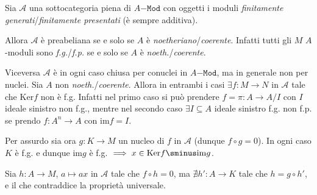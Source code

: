 \begin{example}{}
    Sia \(\mathcal{A}\) una sottocategoria piena di \(A\mathtt{-Mod}\) con
    oggetti i moduli \emph{finitamente generati}/\emph{finitamente presentati}
    (è sempre additiva).

    Allora \(\mathcal{A}\) è preabeliana se e solo se \(A\) è
    \emph{noetheriano}/\emph{coerente}.
    Infatti tutti gli \(M\) \(A\)-moduli sono \emph{f.g.}/\emph{f.p.} se e solo
    se \(A\) è \emph{noeth.}/\emph{coerente}.

    Viceversa \(\mathcal{A}\) è in ogni caso chiusa per conuclei in
    \(A\mathtt{-Mod}\), ma in generale non per nuclei. Sia \(A\) non
    \emph{noeth.}/\emph{coerente}. Allora in entrambi i casi \(\exists f : M \to
    N\) in \(\mathcal{A}\) tale che \(\mathrm{Ker}f\) non è f.g.
    Infatti nel primo caso si può prendere \(f = \pi : A \to A/{I}\)
    con \({I}\)
    ideale sinistro non f.g., mentre nel secondo caso \(\exists  {I}
    \subseteq A \) ideale sinistro f.g. non f.p. se prendo \(f : A^{n} \to A\)
    con \(\mathrm{im}f = {I}\).

    Per assurdo sia ora \(g : K \to M\) un nucleo di \(f\) in \(\mathcal{A}\)
    (dunque \(f \circ g = 0\)). In ogni caso \(K\) è f.g. e dunque \(\mathrm{im}g\) è f.g. 
    \(\implies  x \in \mathrm{Ker}f \sminus \mathrm{im}g\).

    Sia \(h : A \to M\), \(a \mapsto ax\) in \(\mathcal{A}\) tale che \(f \circ
    h = 0\), ma \(\nexists  h' : A \to K\) tale che \(h = g \circ h'\), e il
    che contraddice la proprietà universale.
\end{example}
